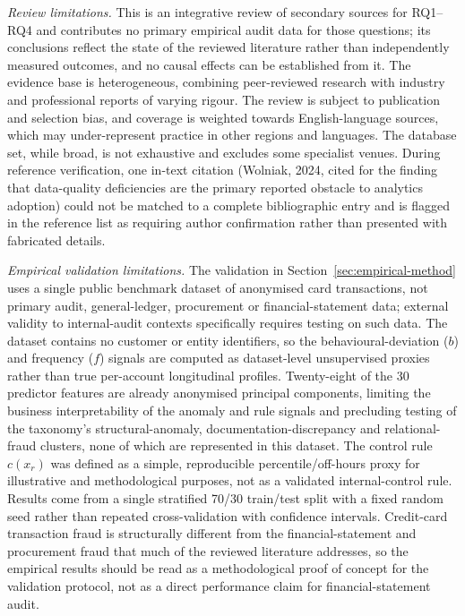 \documentclass[preprint,12pt]{elsarticle}
\begin{document}
\emph{Review limitations.} This is an integrative review of secondary sources for RQ1--RQ4 and contributes no primary empirical audit data for those questions; its conclusions reflect the state of the reviewed literature rather than independently measured outcomes, and no causal effects can be established from it. The evidence base is heterogeneous, combining peer-reviewed research with industry and professional reports of varying rigour. The review is subject to publication and selection bias, and coverage is weighted towards English-language sources, which may under-represent practice in other regions and languages. The database set, while broad, is not exhaustive and excludes some specialist venues. During reference verification, one in-text citation (Wolniak, 2024, cited for the finding that data-quality deficiencies are the primary reported obstacle to analytics adoption) could not be matched to a complete bibliographic entry and is flagged in the reference list as requiring author confirmation rather than presented with fabricated details.

\emph{Empirical validation limitations.} The validation in Section~\ref{sec:empirical-method} uses a single public benchmark dataset of anonymised card transactions, not primary audit, general-ledger, procurement or financial-statement data; external validity to internal-audit contexts specifically requires testing on such data. The dataset contains no customer or entity identifiers, so the behavioural-deviation ($b$) and frequency ($f$) signals are computed as dataset-level unsupervised proxies rather than true per-account longitudinal profiles. Twenty-eight of the 30 predictor features are already anonymised principal components, limiting the business interpretability of the anomaly and rule signals and precluding testing of the taxonomy's structural-anomaly, documentation-discrepancy and relational-fraud clusters, none of which are represented in this dataset. The control rule $c(x_r)$ was defined as a simple, reproducible percentile/off-hours proxy for illustrative and methodological purposes, not as a validated internal-control rule. Results come from a single stratified 70/30 train/test split with a fixed random seed rather than repeated cross-validation with confidence intervals. Credit-card transaction fraud is structurally different from the financial-statement and procurement fraud that much of the reviewed literature addresses, so the empirical results should be read as a methodological proof of concept for the validation protocol, not as a direct performance claim for financial-statement audit.
\end{document}
